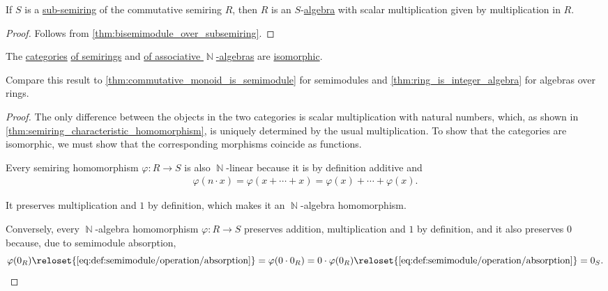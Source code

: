 \begin{proposition}\label{thm:algebra_over_semiring_is_semimodule}
  If \( S \) is a \hyperref[def:semiring/subobject]{sub-semiring} of the commutative semiring \( R \), then \( R \) is an \( S \)-\hyperref[def:algebra_over_semiring]{algebra} with scalar multiplication given by multiplication in \( R \).
\end{proposition}
\begin{proof}
  Follows from \cref{thm:bisemimodule_over_subsemiring}.
\end{proof}

\begin{proposition}\label{thm:semiring_is_natural_number_algebra}
  The \hyperref[def:category]{categories} \hyperref[def:semiring/category]{of semirings} and \hyperref[def:semimodule/category]{of associative \( \BbbN \)-algebras} are \hyperref[def:isomorphism_of_categories]{isomorphic}.
\end{proposition}
\begin{comments}
  \item Compare this result to \cref{thm:commutative_monoid_is_semimodule} for semimodules and \cref{thm:ring_is_integer_algebra} for algebras over rings.
\end{comments}
\begin{proof}
  The only difference between the objects in the two categories is scalar multiplication with natural numbers, which, as shown in \cref{thm:semiring_characteristic_homomorphism}, is uniquely determined by the usual multiplication. To show that the categories are isomorphic, we must show that the corresponding morphisms coincide as functions.

  Every semiring homomorphism \( \varphi: R \to S \) is also \( \BbbN \)-linear because it is by definition additive and
  \begin{align*}
    \varphi(n \cdot x) = \varphi(x + \cdots + x) = \varphi(x) + \cdots + \varphi(x).
  \end{align*}

  It preserves multiplication and \( 1 \) by definition, which makes it an \( \BbbN \)-algebra homomorphism.

  Conversely, every \( \BbbN \)-algebra homomorphism \( \varphi: R \to S \) preserves addition, multiplication and \( 1 \) by definition, and it also preserves \( 0 \) because, due to semimodule absorption,
  \begin{equation*}
    \varphi(0_R)
    \reloset {\eqref{eq:def:semimodule/operation/absorption}} =
    \varphi(0 \cdot 0_R)
    =
    0 \cdot \varphi(0_R)
    \reloset {\eqref{eq:def:semimodule/operation/absorption}} =
    0_S.
  \end{equation*}
\end{proof}

